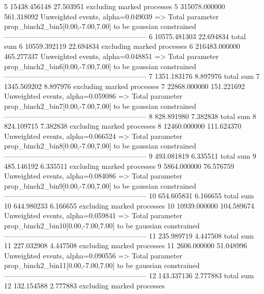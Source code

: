 5          15438.456148    27.503951       excluding marked processes    
5          315078.000000   561.318092      Unweighted events, alpha=0.049039
  => Total parameter prop_binch2_bin5[0.00,-7.00,7.00] to be gaussian constrained
------------------------------------------------------------
6          10575.481303    22.694834       total sum                     
6          10559.392119    22.694834       excluding marked processes    
6          216483.000000   465.277337      Unweighted events, alpha=0.048851
  => Total parameter prop_binch2_bin6[0.00,-7.00,7.00] to be gaussian constrained
------------------------------------------------------------
7          1351.183176     8.897976        total sum                     
7          1345.569202     8.897976        excluding marked processes    
7          22868.000000    151.221692      Unweighted events, alpha=0.059086
  => Total parameter prop_binch2_bin7[0.00,-7.00,7.00] to be gaussian constrained
------------------------------------------------------------
8          828.891980      7.382838        total sum                     
8          824.109715      7.382838        excluding marked processes    
8          12460.000000    111.624370      Unweighted events, alpha=0.066524
  => Total parameter prop_binch2_bin8[0.00,-7.00,7.00] to be gaussian constrained
------------------------------------------------------------
9          493.081819      6.335511        total sum                     
9          485.146192      6.335511        excluding marked processes    
9          5864.000000     76.576759       Unweighted events, alpha=0.084086
  => Total parameter prop_binch2_bin9[0.00,-7.00,7.00] to be gaussian constrained
------------------------------------------------------------
10         654.605831      6.166655        total sum                     
10         644.980233      6.166655        excluding marked processes    
10         10939.000000    104.589674      Unweighted events, alpha=0.059841
  => Total parameter prop_binch2_bin10[0.00,-7.00,7.00] to be gaussian constrained
------------------------------------------------------------
11         235.989719      4.447508        total sum                     
11         227.032908      4.447508        excluding marked processes    
11         2606.000000     51.048996       Unweighted events, alpha=0.090556
  => Total parameter prop_binch2_bin11[0.00,-7.00,7.00] to be gaussian constrained
------------------------------------------------------------
12         143.337136      2.777883        total sum                     
12         132.154588      2.777883        excluding marked processes    
